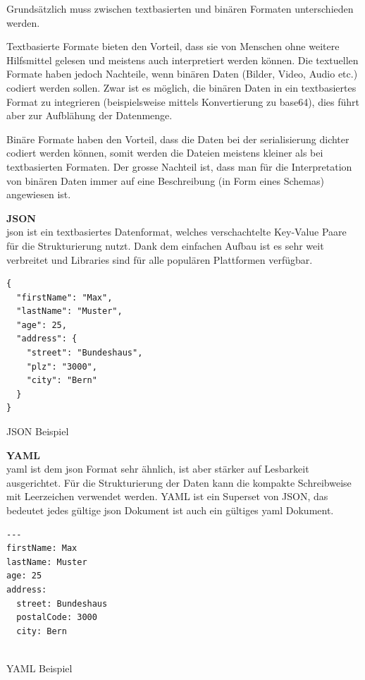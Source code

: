 Grundsätzlich muss zwischen textbasierten und binären Formaten unterschieden werden.

Textbasierte Formate bieten den Vorteil, dass sie von Menschen ohne weitere Hilfsmittel gelesen und meistens auch interpretiert werden können. Die textuellen Formate haben jedoch Nachteile, wenn binären Daten (Bilder, Video, Audio etc.) codiert werden sollen. Zwar ist es möglich, die binären Daten in ein textbasiertes Format zu integrieren (beispielsweise mittels Konvertierung zu \gls{base64}), dies führt aber zur Aufblähung der Datenmenge.

Binäre Formate haben den Vorteil, dass die Daten bei der \gls{serialisierung} dichter codiert werden können, somit werden die Dateien meistens kleiner als bei textbasierten Formaten. Der grosse Nachteil ist, dass man für die Interpretation von binären Daten immer auf eine Beschreibung (in Form eines Schemas) angewiesen ist.

\textbf{JSON} \\
\gls{json} ist ein textbasiertes Datenformat, welches verschachtelte Key-Value Paare für die Strukturierung nutzt. Dank dem einfachen Aufbau ist es sehr weit verbreitet und Libraries sind für alle populären Plattformen verfügbar.

\begin{listing}[H]
\begin{verbatim}
{
  "firstName": "Max",
  "lastName": "Muster",
  "age": 25,
  "address": {
    "street": "Bundeshaus",
    "plz": "3000",
    "city": "Bern"
  }
}

\end{verbatim}
\caption{JSON Beispiel}
\end{listing}


\textbf{YAML} \\ 
\gls{yaml} ist dem \gls{json} Format sehr ähnlich, ist aber stärker auf Lesbarkeit ausgerichtet. Für die Strukturierung der Daten kann die kompakte Schreibweise mit Leerzeichen verwendet werden. 
YAML ist ein Superset von JSON, das bedeutet jedes gültige \gls{json} Dokument ist auch ein gültiges \gls{yaml} Dokument.

\begin{listing}[H]
\begin{verbatim}
---
firstName: Max
lastName: Muster
age: 25
address: 
  street: Bundeshaus
  postalCode: 3000
  city: Bern


\end{verbatim}
\caption{YAML Beispiel}
\end{listing}

